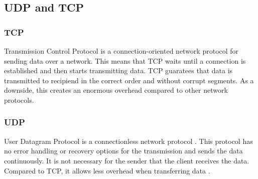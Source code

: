 \subsection{UDP and TCP}
\subsubsection{TCP}
Transmission Control Protocol is a connection-oriented network protocol
for sending data over a network.
This means that TCP waits until a connection is established and
then starts transmitting data\cite{postel1981transmission}.
TCP guaratees that data is transmitted to recipiend
in the correct order and without corrupt segments.
As a downside, this creates an enormous overhead compared
to other network protocols\cite{singh2014survey}\newline.
\subsubsection{UDP}
User Datagram Protocol is a connectionless network protocol
\cite{postel1980user}.
This protocol has no error handling or recovery options for
 the transmission and sends the data continuously.
It is not necessary for the sender that the client 
receives the data.
Compared to TCP, it allows less overhead when transferring data
\cite{singh2014survey}.